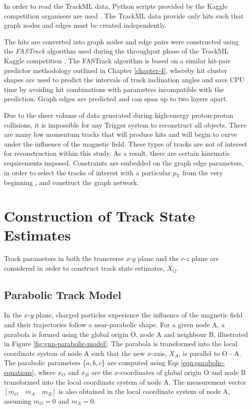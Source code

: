 In order to read the TrackML data, Python scripts provided by the Kaggle competition organisers are used \cite{python-scripts-kaggle}. The TrackML data provide only hits such that graph nodes and edges must be created independently.

The hits are converted into graph nodes and edge pairs were constructed using the \textit{FASTrack} algorithm used during the throughput phase of the TrackML Kaggle competition \cite{Amrouche2023}. The FASTrack algorithm is based on a similar hit-pair predictor methodology outlined in Chapter \ref{chapter-4}, whereby hit cluster shapes are used to predict the intervals of track inclination angles and save CPU time by avoiding hit combinations with parameters incompatible with the prediction. Graph edges are predicted and can span up to two layers apart.

Due to the sheer volume of data generated during high-energy proton-proton collisions, it is impossible for any Trigger system to reconstruct all objects. There are many low momentum tracks that will produce hits and will begin to curve under the influence of the magnetic field. These types of tracks are not of interest for reconstruction within this study. As a result, there are certain kinematic requirements imposed. Constraints are embedded on the graph edge parameters, in order to select the tracks of interest with a particular $p_{\text{T}}$ from the very beginning \cite{Dmitry-fasttrack-addtest}, and construct the graph network. 



\section{Construction of Track State Estimates}
\label{constructing-track-states}

Track parameters in both the transverse $x$-$y$ plane and the $r$-$z$ plane are considered in order to construct track state estimates, $X_{ij}$.


\subsection{Parabolic Track Model}
\label{parabolic-state}

In the $x$-$y$ plane, charged particles experience the influence of the magnetic field and their trajectories follow a near-parabolic shape. For a given node A, a parabola is formed using the global origin O, node A and neighbour B, illustrated in Figure \ref{fig:gnn-parabolic-model}. The parabola is transformed into the local coordinate system of node A such that the new $x$-axis, $X_A$, is parallel to O - A. The parabolic parameters \{$a, b, c$\} are computed using Eqs \eqref{eqn:parabolic-equations}, where $x_O$ and $x_B$ are the $x$-coordinates of global origin O and node B transformed into the local coordinate system of node A. The measurement vector $[m_O \quad m_A \quad m_B]$ is also obtained in the local coordinate system of node A, assuming $m_O = 0$ and $m_A = 0$.

